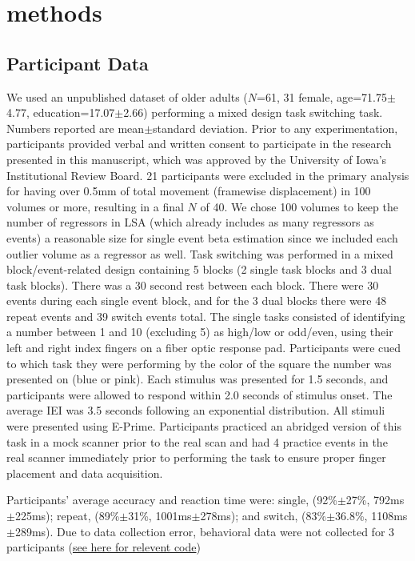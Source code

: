 \documentclass[phd,appendix,figures]{uithesis}
\begin{document}
\section{methods}

\subsection*{Participant Data}
\label{methods:task-switch2}

We used an unpublished dataset
of older adults ($N$=61, 31 female, age=71.75$\pm$4.77, education=17.07$\pm$2.66)
performing a mixed design task switching task.
Numbers reported are mean$\pm$standard deviation.
Prior to any experimentation, participants provided verbal and written consent
to participate in the research presented in this manuscript, which was approved
by the University of Iowa's Institutional Review Board.
21 participants were excluded in the primary analysis for having over
0.5mm of total movement (framewise displacement) in 100 volumes or more,
resulting in a final $N$ of 40.
We chose 100 volumes to keep the number of regressors in LSA
(which already includes as many regressors as events) a reasonable size
for single event beta estimation since we included each outlier volume
as a regressor as well.
Task switching was performed in a mixed block/event-related design containing
5 blocks (2 single task blocks and 3 dual task blocks).
There was a 30 second rest between each block.
There were 30 events during each single event block,
and for the 3 dual blocks there were 48 repeat events and 39 switch events total.
The single tasks consisted of identifying a number between
1 and 10 (excluding 5) as high/low or odd/even, using their left and right index fingers
on a fiber optic response pad.
Participants were cued to which task they were performing by the color of the square
the number was presented on (blue or pink).
Each stimulus was presented for 1.5 seconds, and participants were allowed
to respond within 2.0 seconds of stimulus onset.
The average IEI was 3.5 seconds following an exponential distribution.
All stimuli were presented using E-Prime.
Participants practiced an abridged version of this task in a mock scanner
prior to the real scan and had 4 practice events in the real scanner immediately
prior to performing the task to ensure proper finger placement and data acquisition.

Participants' average accuracy and reaction time were:
single, (92\%$\pm$27\%, 792ms$\pm$225ms); repeat, (89\%$\pm$31\%, 1001ms$\pm$278ms);
and switch, (83\%$\pm$36.8\%, 1108ms$\pm$289ms).
Due to data collection error, behavioral data were not collected for 3 participants
(\href{https://github.com/jdkent/BetaSeriesRealDataAnalysis/blob/b18b44321edf7b662a1e5ea635f64452c8d3644c/summarizeBehavior/summarize_behavior.ipynb}{see here for relevent code})
\end{document}
